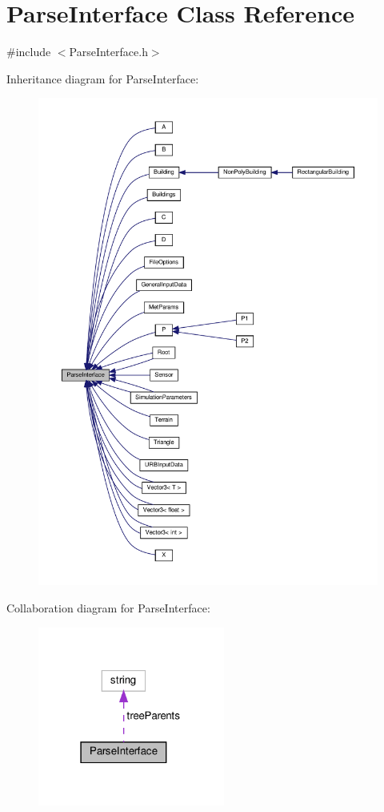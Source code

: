 \hypertarget{classParseInterface}{}\section{Parse\+Interface Class Reference}
\label{classParseInterface}


{\ttfamily \#include $<$Parse\+Interface.\+h$>$}



Inheritance diagram for Parse\+Interface\+:
\nopagebreak
\begin{figure}[H]
\begin{center}
\leavevmode
\includegraphics[width=350pt]{classParseInterface__inherit__graph}
\end{center}
\end{figure}


Collaboration diagram for Parse\+Interface\+:
\nopagebreak
\begin{figure}[H]
\begin{center}
\leavevmode
\includegraphics[width=174pt]{classParseInterface__coll__graph}
\end{center}
\end{figure}
